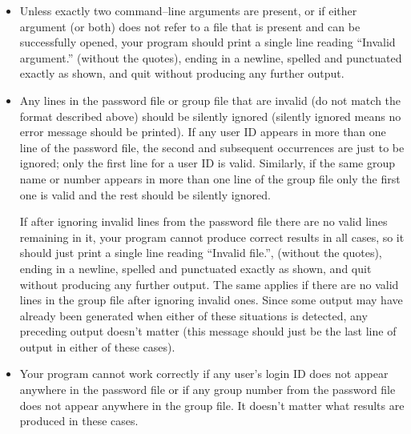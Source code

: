 \documentclass[11pt]{article}
\begin{document}
        \begin{itemize}

          \addtolength{\itemsep}{-1.25mm}

          \item Unless exactly two command--line arguments are present, or
                if either argument (or both) does not refer to a file that
                is present and can be successfully opened, your program
                should print a single line reading ``Invalid argument.''
                (without the quotes), ending in a newline, spelled and
                punctuated exactly as shown, and quit without producing any
                further output.

          \item Any lines in the password file or group file that are
                invalid (do not match the format described above) should be
                silently ignored (silently ignored means no error message
                should be printed).  If any user ID appears in more than one
                line of the password file, the second and subsequent
                occurrences are just to be ignored; only the first line for
                a user ID is valid.  Similarly, if the same group name or
                number appears in more than one line of the group file only
                the first one is valid and the rest should be silently
                ignored.

                If after ignoring invalid lines from the password file there
                are no valid lines remaining in it, your program cannot
                produce correct results in all cases, so it should just
                print a single line reading ``Invalid file.'', (without the
                quotes), ending in a newline, spelled and punctuated exactly
                as shown, and quit without producing any further output.
                The same applies if there are no valid lines in the group
                file after ignoring invalid ones.  Since some output may
                have already been generated when either of these situations
                is detected, any preceding output doesn't matter (this
                message should just be the last line of output in either of
                these cases).

          \item Your program cannot work correctly if any user's login ID
                does not appear anywhere in the password file or if any
                group number from the password file does not appear anywhere
                in the group file.  It doesn't matter what results are
                produced in these cases.


\end{itemize}
\end{document}
